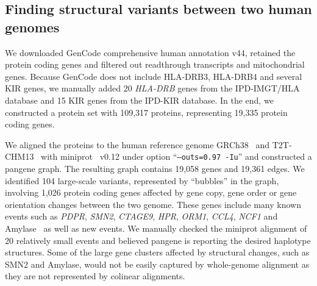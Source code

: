 \documentclass[webpdf,contemporary,large,namedate]{oup-authoring-template}%
\begin{document}
\subsection{Finding structural variants between two human genomes}

We downloaded GenCode comprehensive human annotation v44,
retained the protein coding genes and filtered out readthrough transcripts and mitochondrial genes.
Because GenCode does not include HLA-DRB3, HLA-DRB4 and several KIR genes,
we manually added 20 {\it HLA-DRB} genes from the IPD-IMGT/HLA database and
15 KIR genes from the IPD-KIR database.
In the end, we constructed a protein set with 109,317 proteins, representing 19,335 protein coding genes.

We aligned the proteins to the human reference genome GRCh38~\citep{Schneider:2017aa} and T2T-CHM13~\citep{Nurk:2022up}
with miniprot~\citep{Li:2023ac} v0.12 under option ``{\tt --outs=0.97 -Iu}''
and constructed a pangene graph.
The resulting graph contains 19,058 genes and 19,361 edges.
We identified 104 large-scale variants, represented by ``bubbles'' in the graph,
involving 1,026 protein coding genes affected by gene copy, gene order or gene orientation changes between the two genome.
These genes include many known events such as {\it PDPR}, {\it SMN2}, {\it CTAGE9}, {\it HPR}, {\it ORM1}, {\it CCL4}, {\it NCF1} and Amylase~\citep{Handsaker:2015ur,Sudmant:2010aa}
as well as new events.
We manually checked the miniprot alignment of 20 relatively small events
and believed pangene is reporting the desired haplotype structures.
Some of the large gene clusters affected by structural changes, such as SMN2 and Amylase,
would not be easily captured by whole-genome alignment as they are not represented by colinear alignments.
\end{document}

